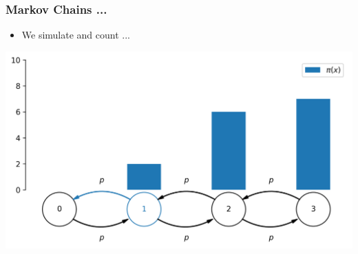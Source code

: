 \begin{frame}[c]
    \frametitle{Markov Chains ...}
    \begin{itemize}
        \item We simulate and count ...
    \end{itemize}
    \begin{center}
        \includegraphics[scale=0.6]{imgs/simulation14.png}
    \end{center}
\end{frame}


